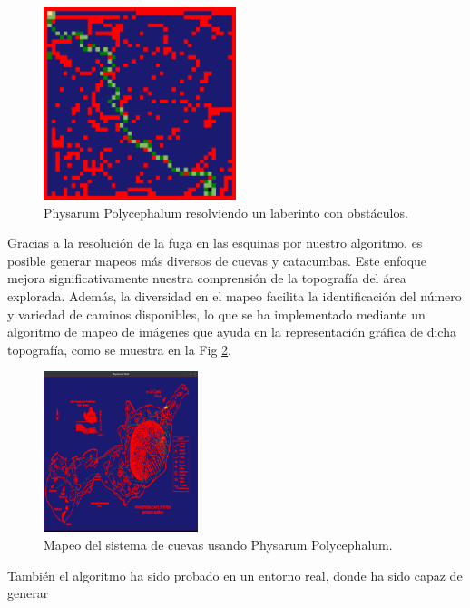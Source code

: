     \begin{figure}[htbp]
        \centerline{\includegraphics[width=0.5\textwidth]{./images/desarrollo/physarum/Obstaculos1.png}}
        \caption{Physarum Polycephalum resolviendo un laberinto con obst\'aculos.}
        \label{fig:physarumObstacles1}
    \end{figure}
    \vskip 0.5cm
    Gracias a la resoluci\'on de la fuga en las esquinas por nuestro algoritmo, es posible generar mapeos m\'as diversos 
        de cuevas y catacumbas. Este enfoque mejora significativamente nuestra comprensi\'on 
        de la topograf\'ia del \'area explorada. Adem\'as, la diversidad en el mapeo facilita la identificaci\'on 
        del n\'umero y variedad de caminos disponibles, lo que se ha implementado mediante un algoritmo de mapeo de im\'agenes que 
        ayuda en la representaci\'on gr\'afica de dicha topograf\'ia, como se muestra en la Fig \ref{fig:CaveSystemPhysarum}.
    \vskip 0.5cm
        \begin{figure}[htbp]
            \centerline{\includegraphics[width=0.40\textwidth]{./images/desarrollo/physarum/CaveSystemPhysarum.png}}
            \caption{Mapeo del sistema de cuevas usando Physarum Polycephalum.}
            \label{fig:CaveSystemPhysarum}
        \end{figure}
        \vskip 0.2cm
        Tambi\'en el algoritmo ha sido probado en un entorno real, donde ha sido capaz de generar 
